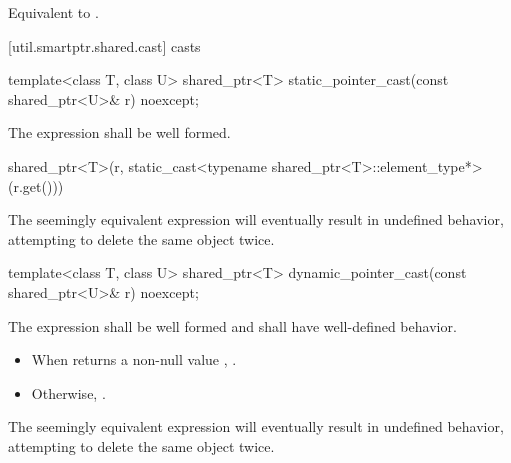 \begin{itemdescr}
\pnum\effects  Equivalent to .
\end{itemdescr}

[util.smartptr.shared.cast]{ casts}

%
\begin{itemdecl}
template<class T, class U>
  shared_ptr<T> static_pointer_cast(const shared_ptr<U>& r) noexcept;
\end{itemdecl}

\begin{itemdescr}
\pnum
\requires The expression  shall
be well formed.

\pnum
\returns
\begin{codeblock}
shared_ptr<T>(r, static_cast<typename shared_ptr<T>::element_type*>(r.get()))
\end{codeblock}

\pnum
\begin{note}
The seemingly equivalent expression
will eventually result in undefined behavior, attempting to delete the
same object twice.
\end{note}
\end{itemdescr}

%
\begin{itemdecl}
template<class T, class U>
  shared_ptr<T> dynamic_pointer_cast(const shared_ptr<U>& r) noexcept;
\end{itemdecl}

\begin{itemdescr}
\pnum
\requires The expression 
shall be well formed and shall have well-defined behavior.

\pnum
\returns
\begin{itemize}
\item When 
returns a non-null value , .
\item Otherwise, .
\end{itemize}

\pnum
\begin{note}
The seemingly equivalent expression
 will eventually result in
undefined behavior, attempting to delete the same object twice.
\end{note}
\end{itemdescr}

